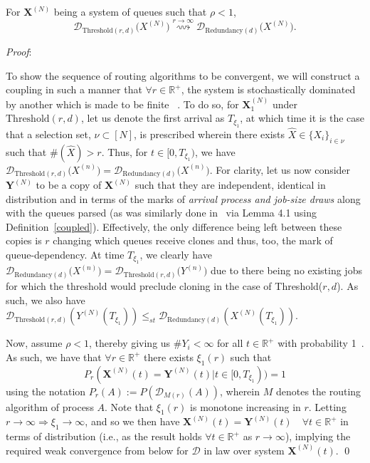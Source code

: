 \begin{lemma}
    \label{sup}
    For $\mathbf{X}^{(N)}$ being a system of queues such that $\rho < 1$,
     \[\mathcal{D}_{\mathrm{Threshold}(r,d)}\mathbf(X^{(N)}) \overset{r \rightarrow \infty}{\rightsquigarrow} \mathcal{D}_{\mathrm{Redundancy}(d)}\mathbf(X^{(N)}).\]
\end{lemma}
\textit{Proof}:

To show the sequence of routing algorithms to be convergent, we will construct a coupling in such a manner that $\forall r \in \mathbb{R}^{+}$, the system is stochastically dominated by another which is made to be finite~\cite{baccelli_elements_2003} .
To do so, for $\mathbf{X}_{1}^{(N)}$ under $\text{Threshold}(r,d)$, let us denote the first arrival as $T_{\xi_{1}}$, at which time it is the case that a selection set, $\nu \subset [N] $, is prescribed wherein there exists $\hat X \in \{X_{i}\}_{i \in \nu} $ such that $ \# (\hat X) > r $.
Thus, for  $ t \in [0,T_{\xi_{1}})$, we have $\mathcal{D}_{\text{Threshold}\mathit{(r,d)}}\mathbf(X^{(n)}) = \mathcal{D}_{\text{Redundancy}\mathit{(d)}}\mathbf(X^{(n)})$.
For clarity, let us now consider $\mathbf{Y}^{(N)}$ to be a copy of  $\mathbf{X}^{(N)}$ such that they are independent, identical in distribution and in terms of the marks of \textit{arrival process and job-size draws} along with the queues parsed (as was similarly done in~\cite{bramson_asymptotic_2012} via Lemma 4.1 using Definition~\ref{coupled}).
Effectively, the only difference being left between these copies is $r$ changing which queues receive clones and thus, too, the mark of queue-dependency.
At time $T_{\xi_{1}}$, we clearly have $\mathcal{D}_{\text{Redundancy}\mathit{(d)}}\mathbf(X^{(n)}) = \mathcal{D}_{\text{Threshold}\mathit{(r,d)}}\mathbf(Y^{(n)})$ due to there being no existing jobs for which the threshold would preclude cloning in the case of Threshold($r,d$).
As such, we also have $\mathcal{D}_{\text{Threshold}(r,d)}(Y^{(N)}(T_{\xi_{1}}))\leq_{st}\mathcal{D}_{\text{Redundancy}(d)}(X^{(N)}(T_{\xi_{1}}))$.

Now, assume $\rho < 1$, thereby giving us $ \# Y_{i}  < \infty$ for all $t \in \mathbb{R}^{+}$ with probability 1~\cite{gardner_redundancy-d_2017}.
As such, we have that $\forall r \in \mathbb{R}^{+}$ there exists $ \xi_{1}(r) $ such that
\[P_{r}(\mathbf{X}^{(N)} (t) = \mathbf{Y}^{(N)}(t) |t \in [0,T_{\xi_{1}})) = 1\]
using the notation $P_{r}(A) := P(\mathcal{D}_{M(r)}(A))$, wherein $M$ denotes the routing algorithm of process $A$.
Note that $\xi_{1} (r)$ is monotone increasing in $r$.
Letting $r \rightarrow \infty \Rightarrow \xi_{1} \rightarrow \infty$, and so we then have $\mathbf{X}^{(N)}(t) =  \mathbf{Y}^{(N)}(t) \quad \forall t \in \mathbb{R}^{+}$ in terms of distribution (i.e., as the result holds $\forall t \in \mathbb{R}^{+}$ as $r\rightarrow \infty$), implying the required weak convergence from below for $\mathcal{D}$ in law over system  $\mathbf{X}^{(N)}(t)$.  \qed

